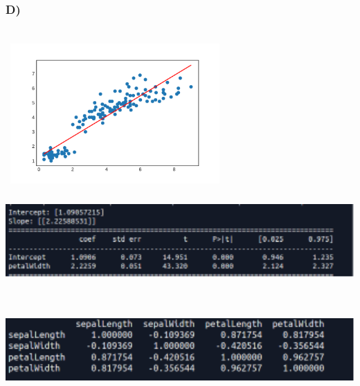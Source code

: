 \documentclass[12pt]{article}
\begin{document}
\subsubsection{D)}\
\includegraphics[width=8cm, height=6.5cm]{LR_mul}\\
\includegraphics[width=15cm, height=3cm]{ss6}\\\\\\
\includegraphics[width=15cm, height=3cm]{ss9}
\end{document}
